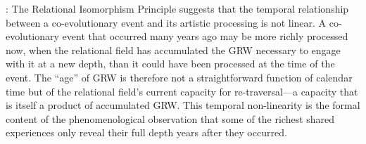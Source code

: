 : The Relational Isomorphism Principle suggests that the temporal relationship between a co-evolutionary event and its artistic processing is not linear. A co-evolutionary event that occurred many years ago may be more richly processed now, when the relational field has accumulated the GRW necessary to engage with it at a new depth, than it could have been processed at the time of the event. The ``age'' of GRW is therefore not a straightforward function of calendar time but of the relational field's current capacity for re-traversal---a capacity that is itself a product of accumulated GRW. This temporal non-linearity is the formal content of the phenomenological observation that some of the richest shared experiences only reveal their full depth years after they occurred.
